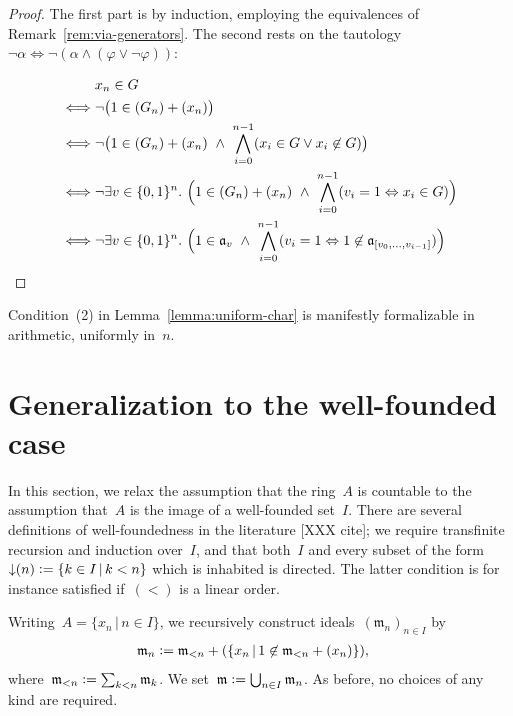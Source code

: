 \documentclass[envcountsect,envcountsame,runningheads]{llncs}
\newcommand{\aaa}{\mathfrak{a}}
\newcommand{\mmm}{\mathfrak{m}}
\newcommand{\defeq}{\vcentcolon=}
\renewcommand{\_}{\mathpunct{.}\,}
\begin{document}
\begin{proof}The first part is by induction, employing the equivalences of
Remark~\ref{rem:via-generators}. The second rests on the tautology
$\neg\alpha \Longleftrightarrow \neg(\alpha \wedge (\varphi \vee \neg\varphi))$:

\vspace*{-1.2em}\small
\begin{align*}
  &\mathrel{\phantom{\Longleftrightarrow}} x_n \in G \\
  &\Longleftrightarrow \neg\bigl(1 \in (G_n) + (x_n)\bigr) \\
  &\Longleftrightarrow \neg\bigl(1 \in (G_n) + (x_n) \ \wedge\ \bigwedge_{i=0}^{n-1} (x_i \in G \vee x_i \not\in G)\bigr) \\
  &\Longleftrightarrow \neg\exists v \in \{0,1\}^n\_
    \Bigl(1 \in (G_n) + (x_n) \ \wedge\ \bigwedge_{i=0}^{n-1} (v_i = 1
    \Leftrightarrow x_i \in G)\Bigr) \\
  &\Longleftrightarrow \neg\exists v \in \{0,1\}^n\_
    \Bigl(1 \in \aaa_v \ \wedge\ \bigwedge_{i=0}^{n-1} (v_i = 1
    \Leftrightarrow 1 \not\in \aaa_{[v_0,\ldots,v_{i-1}]})\Bigr) %
\end{align*}
\end{proof}

Condition~(2) in Lemma~\ref{lemma:uniform-char} is manifestly formalizable in
arithmetic, uniformly in~$n$.


\section{Generalization to the well-founded case}

In this section, we relax the assumption that the ring~$A$ is countable to the
assumption that~$A$ is the image of a well-founded set~$I$. There are several
definitions of well-foundedness in the literature [XXX cite]; we require
transfinite recursion and induction over~$I$, and that both~$I$ and every subset
of the form~${{\downarrow}(n)} \defeq \{k \in I \,|\, k < n\}$ which is inhabited is directed. The
latter condition is for instance satisfied if~$({<})$ is a linear order.

Writing~$A = \{ x_n \,|\, n \in I \}$, we recursively construct
ideals~$(\mmm_n)_{n \in I}$ by
\begin{align*}
  \mmm_n &\defeq \mmm_{<n} + (\{ x_n \,|\, 1 \not\in \mmm_{<n} + (x_n) \}),
\end{align*}
where~$\mmm_{<n} \defeq \sum_{k < n} \mmm_k$. We set~$\mmm \defeq \bigcup_{n
\in I} \mmm_n$. As before, no choices of any kind are required.
\end{document}
